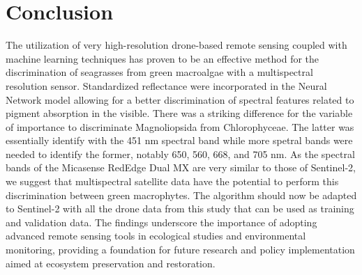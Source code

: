 \documentclass[
  number]{elsarticle}
\begin{document}
\section{Conclusion}\label{conclusion}

The utilization of very high-resolution drone-based remote sensing
coupled with machine learning techniques has proven to be an effective
method for the discrimination of seagrasses from green macroalgae with a
multispectral resolution sensor. Standardized reflectance were
incorporated in the Neural Network model allowing for a better
discrimination of spectral features related to pigment absorption in the
visible. There was a striking difference for the variable of importance
to discriminate Magnoliopsida from Chlorophyceae. The latter was
essentially identify with the 451 nm spectral band while more spetral
bands were needed to identify the former, notably 650, 560, 668, and 705
nm. As the spectral bands of the Micasense RedEdge Dual MX are very
similar to those of Sentinel-2, we suggest that multispectral satellite
data have the potential to perform this discrimination between green
macrophytes. The algorithm should now be adapted to Sentinel-2 with all
the drone data from this study that can be used as training and
validation data. The findings underscore the importance of adopting
advanced remote sensing tools in ecological studies and environmental
monitoring, providing a foundation for future research and policy
implementation aimed at ecosystem preservation and restoration.


  
\end{document}
